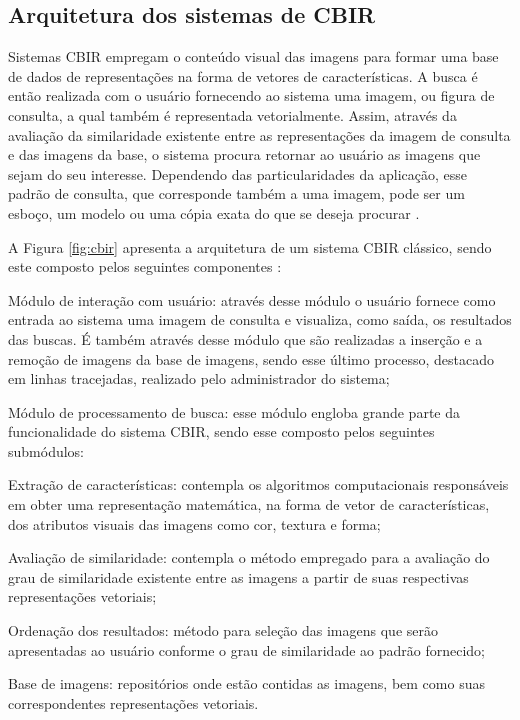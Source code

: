 \subsection{Arquitetura dos sistemas de \acl{CBIR}}

Sistemas \ac{CBIR} empregam o conteúdo visual das imagens para formar uma base de dados de representações na forma de vetores de características. A busca é então realizada com o usuário fornecendo ao sistema uma imagem, ou figura de consulta, a qual também é representada vetorialmente. Assim, através da avaliação da similaridade existente entre as representações da imagem de consulta e das imagens da base, o sistema procura retornar ao usuário as imagens que sejam do seu interesse. Dependendo das particularidades da aplicação, esse padrão de consulta, que corresponde também a uma imagem, pode ser um esboço, um modelo ou uma cópia exata do que se deseja procurar \cite{Smeulders:2000}.

\begin{comment}
Sistemas \emph{CBIR} realizam buscas em bases multimídia utilizando o conteúdo visual das imagens, visando recuperar imagens que sejam do interesse do usuário mediante um padrão de consulta especificado. O campo das pesquisas em recuperação de imagens pelo conteúdo é vasto e relativamente recente.
\end{comment}


A Figura \ref{fig:cbir} apresenta a arquitetura de um sistema \ac{CBIR} clássico, sendo este composto pelos seguintes componentes \cite{Torres:2006}:

\begin{alineas}
\item Módulo de interação com usuário: através desse módulo o usuário fornece como entrada ao sistema uma imagem de consulta e visualiza, como saída, os resultados das buscas. É também através desse módulo que são realizadas a inserção e a remoção de imagens da base de imagens, sendo esse último processo, destacado em linhas tracejadas, realizado pelo administrador do sistema;  
\item Módulo de processamento de busca: esse módulo engloba grande parte da funcionalidade do sistema \ac{CBIR}, sendo esse composto pelos seguintes submódulos:
\begin{alineas}
\item Extração de características: contempla os algoritmos computacionais responsáveis em obter uma representação matemática, na forma de vetor de características, dos atributos visuais das imagens como cor, textura e forma;
\item Avaliação de similaridade: contempla o método empregado para a avaliação do grau de similaridade existente entre as imagens a partir de suas respectivas representações vetoriais;
\item Ordenação dos resultados: método para seleção das imagens que serão apresentadas ao usuário conforme o grau de similaridade ao padrão fornecido;
\end{alineas} 
\item Base de imagens: repositórios onde estão contidas as imagens, bem como suas correspondentes representações vetoriais.
\end{alineas}

